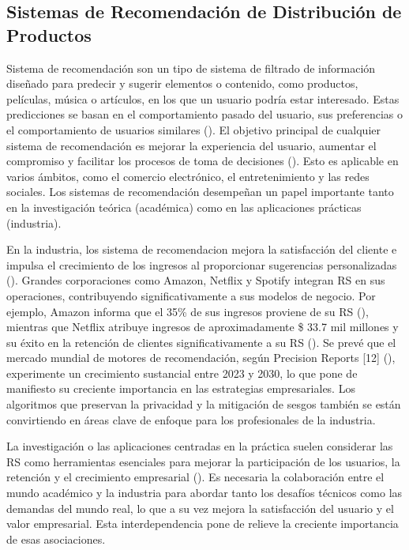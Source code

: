 \subsection{Sistemas de Recomendación de Distribución de Productos}

Sistema de recomendación son un tipo de sistema de filtrado de información diseñado para predecir y sugerir elementos o contenido, como productos, películas, música o artículos, en los que un usuario podría estar interesado. Estas predicciones se basan en el comportamiento pasado del usuario, sus preferencias o el comportamiento de usuarios similares (\cite{aggarwal2016}). 
El objetivo principal de cualquier sistema de recomendación es mejorar la experiencia del usuario, aumentar el compromiso y facilitar los procesos de toma de decisiones (\cite{berkovsky2008}). Esto es aplicable en varios ámbitos, como el comercio electrónico, el entretenimiento y las redes sociales. Los sistemas de recomendación desempeñan un papel importante tanto en la investigación teórica (académica) como en las aplicaciones prácticas (industria).

En la industria, los sistema de recomendacion mejora la satisfacción del cliente e impulsa el crecimiento de los ingresos al proporcionar sugerencias personalizadas (\cite{amatriain2016}). Grandes corporaciones como Amazon, Netflix y Spotify integran RS en sus operaciones, contribuyendo significativamente a sus modelos de negocio. Por ejemplo, Amazon informa que el 35\% de sus ingresos proviene de su RS (\cite{mackenzie2013}), mientras que Netflix atribuye ingresos de aproximadamente \$ 33.7 mil millones y su éxito en la retención de clientes significativamente a su RS (\cite{iqbal2024}). Se prevé que el mercado mundial de motores de recomendación, según Precision Reports [12] (\cite{precision2024}), experimente un crecimiento sustancial entre 2023 y 2030, lo que pone de manifiesto su creciente importancia en las estrategias empresariales. Los algoritmos que preservan la privacidad y la mitigación de sesgos también se están convirtiendo en áreas clave de enfoque para los profesionales de la industria.

La investigación o las aplicaciones centradas en la práctica suelen considerar las RS como herramientas esenciales para mejorar la participación de los usuarios, la retención y el crecimiento empresarial (\cite{amatriain2016, melville2010}). Es necesaria la colaboración entre el mundo académico y la industria para abordar tanto los desafíos técnicos como las demandas del mundo real, lo que a su vez mejora la satisfacción del usuario y el valor empresarial. Esta interdependencia pone de relieve la creciente importancia de esas asociaciones.

